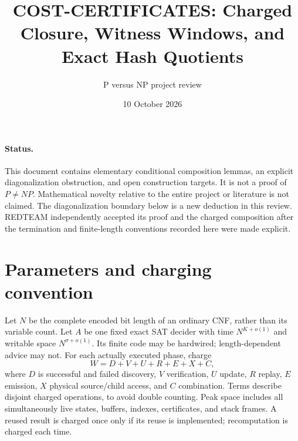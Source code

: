 \documentclass[11pt]{article}
\title{COST-CERTIFICATES: Charged Closure, Witness Windows, and Exact Hash Quotients}
\author{P versus NP project review}
\date{10 October 2026}
\begin{document}
\maketitle
\paragraph{Status.} This document contains elementary conditional composition
lemmas, an explicit diagonalization obstruction, and open construction targets.
It is not a proof of $P\ne NP$. Mathematical novelty relative to the entire
project or literature is not claimed. The diagonalization boundary below is a
new deduction in this review. REDTEAM independently accepted its proof and
the charged composition after the termination and finite-length conventions
recorded here were made explicit.

\section{Parameters and charging convention}
Let $N$ be the complete encoded bit length of an ordinary CNF, rather than its
variable count. Let $A$ be one fixed exact SAT decider with time $N^{K+o(1)}$
and writable space $N^{\sigma+o(1)}$. Its finite code may be hardwired;
length-dependent advice may not. For each actually executed phase, charge
\[
 W=D+V+U+R+E+X+C,
\]
where $D$ is successful and failed discovery, $V$ verification, $U$ update,
$R$ replay, $E$ emission, $X$ physical source/child access, and $C$ combination.
Terms describe disjoint charged operations, to avoid double counting.
Peak space includes all simultaneously live states, buffers, indexes,
certificates, and stack frames. A reused result is charged once only if its
reuse is implemented; recomputation is charged each time.
\end{document}
